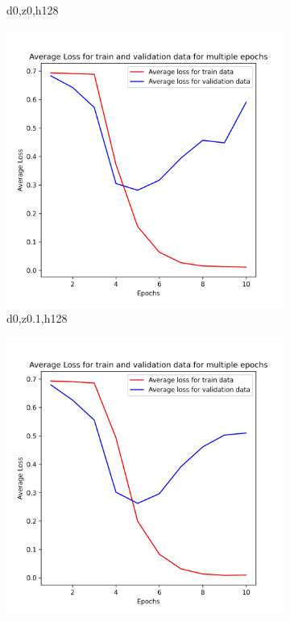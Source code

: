 \documentclass{article}
\begin{document}
\begin{figure}
\begin{subfigure}[b]{0.22\textwidth}
		\caption{d0,z0,h128}
	\end{subfigure}
	\begin{subfigure}[b]{0.22\textwidth}
		\centering
		\includegraphics[width=\textwidth]{d0_z0.1_h128_1D_1.jpg}
		\caption{d0,z0.1,h128}
	\end{subfigure}
	\begin{subfigure}[b]{0.22\textwidth}
		\centering
		\includegraphics[width=\textwidth]{d0_z0.1_h128_1D_2.jpg}

\end{subfigure}
\end{figure}
\end{document}
